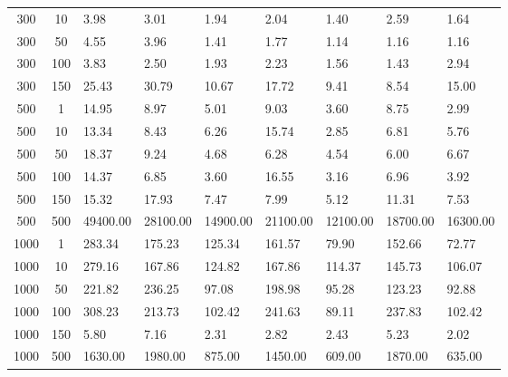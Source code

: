 \begin{table*}
\begin{center}
\begin{tabular}{cc|lllllll}
300   & 10   & 3.98          & 3.01          & 1.94         & 2.04          & 1.40         & 2.59         & 1.64         \\
300   & 50   & 4.55          & 3.96          & 1.41         & 1.77          & 1.14         & 1.16         & 1.16         \\
300   & 100  & 3.83          & 2.50          & 1.93         & 2.23          & 1.56         & 1.43         & 2.94         \\
300   & 150  & 25.43         & 30.79         & 10.67        & 17.72         & 9.41         & 8.54         & 15.00        \\
500   & 1    & 14.95         & 8.97          & 5.01         & 9.03          & 3.60         & 8.75         & 2.99         \\
500   & 10   & 13.34         & 8.43          & 6.26         & 15.74         & 2.85         & 6.81         & 5.76         \\
500   & 50   & 18.37         & 9.24          & 4.68         & 6.28          & 4.54         & 6.00         & 6.67         \\
500   & 100  & 14.37         & 6.85          & 3.60         & 16.55         & 3.16         & 6.96         & 3.92         \\
500   & 150  & 15.32         & 17.93         & 7.47         & 7.99          & 5.12         & 11.31        & 7.53         \\
500   & 500  & 49400.00      & 28100.00      & 14900.00     & 21100.00      & 12100.00     & 18700.00     & 16300.00     \\
1000  & 1    & 283.34        & 175.23        & 125.34       & 161.57        & 79.90        & 152.66       & 72.77        \\
1000  & 10   & 279.16        & 167.86        & 124.82       & 167.86        & 114.37       & 145.73       & 106.07       \\
1000  & 50   & 221.82        & 236.25        & 97.08        & 198.98        & 95.28        & 123.23       & 92.88        \\
1000  & 100  & 308.23        & 213.73        & 102.42       & 241.63        & 89.11        & 237.83       & 102.42       \\
1000  & 150  & 5.80          & 7.16          & 2.31         & 2.82          & 2.43         & 5.23         & 2.02         \\
1000  & 500  & 1630.00       & 1980.00       & 875.00       & 1450.00       & 609.00       & 1870.00      & 635.00       \\

\end{tabular}
\end{center}
\end{table*}
